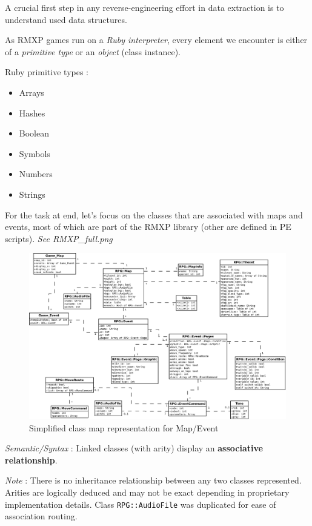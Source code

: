 \documentclass[11pt]{article}
\begin{document}
A crucial first step in any reverse-engineering effort in data extraction is to understand used data structures.

As RMXP games run on a \textit{Ruby interpreter}, every element we encounter is either of a \textit{primitive type} or an \textit{object} (class instance).

Ruby primitive types :
\begin{itemize}
	\item Arrays
	\item Hashes
	\item Boolean
	\item Symbols
	\item Numbers
	\item Strings
	
\end{itemize}

\vspace{2mm}
For the task at end, let's focus on the classes that are associated with maps and events, most of which are part of the RMXP library (other are defined in PE scripts). \textit{See RMXP\_full.png}

\begin{figure}[!h]
	\centering
	\includegraphics[width=\linewidth]{RMXP_full}
		\caption{Simplified class map representation for Map/Event}
	
\end{figure}


\textit{Semantic/Syntax} : Linked classes (with arity) display an \textbf{associative relationship}.

\textit{Note} : There is no inheritance relationship between any two classes represented. Arities are logically deduced and may not be exact depending in proprietary implementation details. Class \verb|RPG::AudioFile| was duplicated for ease of association routing.
\end{document}
